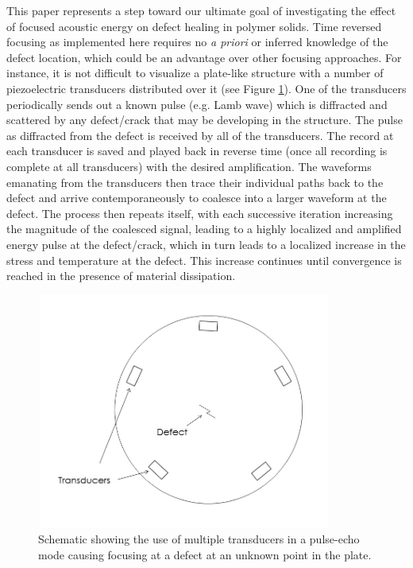 \documentclass[11pt,letterpaper]{article}%
\begin{document}
This paper represents a step toward our ultimate goal of
investigating the effect of focused acoustic energy on defect
healing in polymer solids.  Time reversed focusing as implemented
here requires no {\em a priori} or inferred knowledge of the
defect location, which could be an advantage over other focusing
approaches.  For instance, it is not difficult to visualize a
plate-like structure with a number of piezoelectric transducers
distributed over it (see Figure \ref{explain}).  One of the
transducers periodically sends out a known pulse (e.g. Lamb wave)
which is diffracted and scattered by any defect/crack that may be
developing in the structure.  The pulse as diffracted from the
defect is received by all of the transducers.  The record at each
transducer is saved and played back in reverse time (once all
recording is complete at all transducers) with the desired
amplification.  The waveforms emanating from the transducers then
trace their individual paths back to the defect and arrive
contemporaneously to coalesce into a larger waveform at the
defect.  The process then repeats itself, with each successive
iteration increasing the magnitude of the coalesced signal,
leading to a highly localized and amplified energy pulse at the
defect/crack, which in turn leads to a localized increase in the
stress and temperature at the defect. This increase continues
until convergence is reached in the presence of material
dissipation.
\begin{figure}
\begin{center}
\includegraphics[width=9.7cm,height=7.75cm]{tr.jpg}
\end{center}
 \caption[des1]
   { \label{explain}
Schematic showing the use of multiple transducers in a pulse-echo
mode causing focusing at a defect at an unknown point in the
plate.
 }
 \end{figure}
\end{document}
